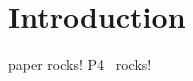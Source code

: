 \section{Introduction} 
\label{sec:introduction}

 paper rocks! P4~\cite{Bosshart2014} rocks! \blindtext[2]

